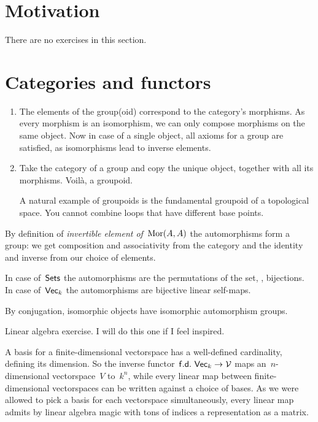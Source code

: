 \section{Motivation}

There are no exercises in this section.


\section{Categories and functors}

\begin{exercise}
  \begin{enumerate}
    \item The elements of the group(oid) correspond to the category's morphisms. As every morphism is an isomorphism, we can only compose morphisms on the same object. Now in case of a single object, all axioms for a group are satisfied, as isomorphisms lead to inverse elements.

    \item Take the category of a group and copy the unique object, together with all its morphisms. Voil\`a, a groupoid.

      A natural example of groupoids is the fundamental groupoid of a topological space. You cannot combine loops that have different base points.
  \end{enumerate}
\end{exercise}

\begin{exercise}
  By definition of \emph{invertible element of~$\operatorname{Mor}(A,A)$} the automorphisms form a group: we get composition and associativity from the category and the identity and inverse from our choice of elements.
  
  In case of~$\mathsf{Sets}$ the automorphisms are the permutations of the set, \ie, bijections. In case of~$\mathsf{Vec}_k$ the automorphisms are bijective linear self-maps.

  By conjugation, isomorphic objects have isomorphic automorphism groups.
\end{exercise}

\begin{exercise} %
  Linear algebra exercise. I will do this one if I feel inspired.
\end{exercise}

\begin{exercise}
  A basis for a finite-dimensional vectorspace has a well-defined cardinality, defining its dimension. So the inverse functor~$\mathsf{f.d.\ Vec}_k\to\mathcal{V}$ maps an~$n$\nobreakdash-dimensional vectorspace~$V$ to~$k^n$, while every linear map between finite-dimensional vectorspaces can be written against a choice of bases. As we were allowed to pick a basis for each vectorspace simultaneously, every linear map admits by linear algebra magic with tons of indices a representation as a matrix.
\end{exercise}


